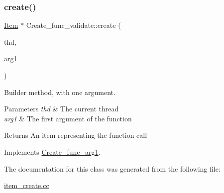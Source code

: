 \subsubsection{\texorpdfstring{create()}{create()}}
{\footnotesize\ttfamily \mbox{\hyperlink{classItem}{Item}} $\ast$ Create\+\_\+func\+\_\+validate\+::create (\begin{DoxyParamCaption}\item[{T\+HD $\ast$}]{thd,  }\item[{\mbox{\hyperlink{classItem}{Item}} $\ast$}]{arg1 }\end{DoxyParamCaption})\hspace{0.3cm}{\ttfamily [virtual]}}

Builder method, with one argument. 
\begin{DoxyParams}{Parameters}
{\em thd} & The current thread \\
\hline
{\em arg1} & The first argument of the function \\
\hline
\end{DoxyParams}
\begin{DoxyReturn}{Returns}
An item representing the function call 
\end{DoxyReturn}


Implements \mbox{\hyperlink{classCreate__func__arg1_a3e9a98f755cd82c3e762e334c955a8c9}{Create\+\_\+func\+\_\+arg1}}.



The documentation for this class was generated from the following file\+:\begin{DoxyCompactItemize}
\item 
\mbox{\hyperlink{item__create_8cc}{item\+\_\+create.\+cc}}\end{DoxyCompactItemize}
